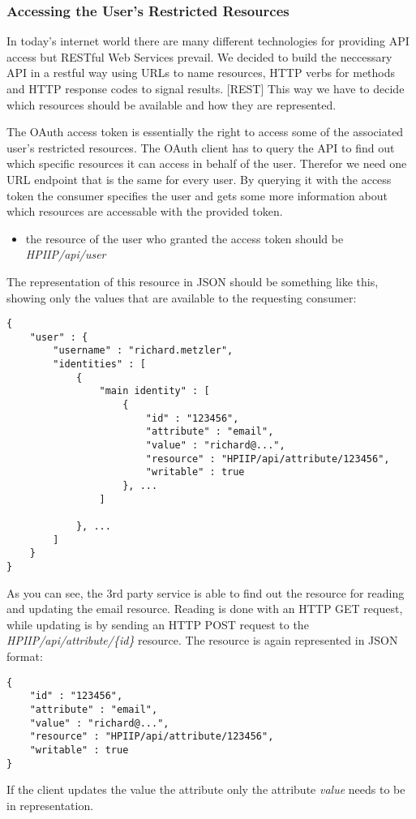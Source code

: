 \subsubsection{Accessing the User's Restricted Resources}

In today's internet world there are many different technologies for
providing API access but RESTful Web Services prevail. We decided
to build the neccessary API in a restful way using URLs to name
resources, HTTP verbs for methods and HTTP response codes to signal
results. [REST] This way we have to decide which resources should
be available and how they are represented.

The OAuth access token is essentially the right to access some of
the associated user's restricted resources. The OAuth client has to
query the API to find out which specific resources it can access in
behalf of the user. Therefor we need one URL endpoint that is the
same for every user. By querying it with the access token the
consumer specifies the user and gets some more information about
which resources are accessable with the provided token.

\begin{itemize}
\item
  the resource of the user who granted the access token should be
  \emph{HPIIP/api/user}
\end{itemize}
The representation of this resource in JSON should be something
like this, showing only the values that are available to the
requesting consumer:

\begin{verbatim}
{
    "user" : {
        "username" : "richard.metzler",
        "identities" : [
            {
                "main identity" : [
                    {
                        "id" : "123456",
                        "attribute" : "email",
                        "value" : "richard@...",
                        "resource" : "HPIIP/api/attribute/123456",
                        "writable" : true
                    }, ...
                ]

            }, ...
        ]
    }
}
\end{verbatim}
As you can see, the 3rd party service is able to find out the
resource for reading and updating the email resource. Reading is
done with an HTTP GET request, while updating is by sending an HTTP
POST request to the \emph{HPIIP/api/attribute/\{id\}} resource. The
resource is again represented in JSON format:

\begin{verbatim}
{
    "id" : "123456",
    "attribute" : "email",
    "value" : "richard@...",
    "resource" : "HPIIP/api/attribute/123456",
    "writable" : true
}
\end{verbatim}
If the client updates the value the attribute only the attribute
\emph{value} needs to be in representation.

